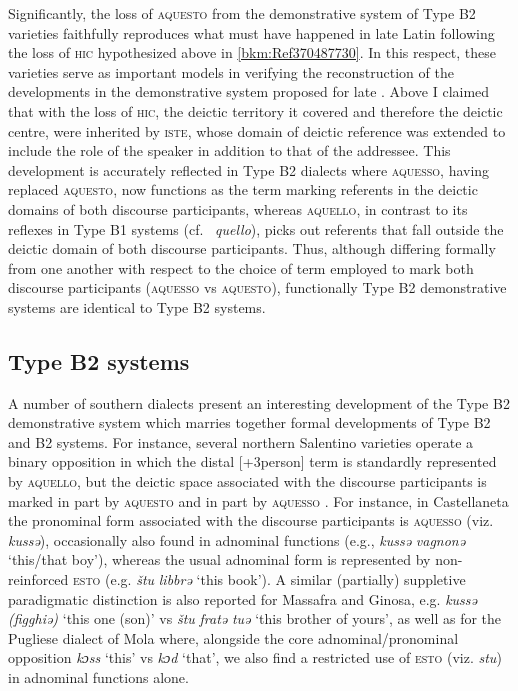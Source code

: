 \documentclass[output=paper]{langsci/langscibook}
\begin{document}
Significantly, the loss of \textsc{aquesto} from the demonstrative system of
Type B2 varieties faithfully reproduces what must have happened in late
Latin following the loss of \textsc{hic} hypothesized above in
\cref{bkm:Ref370487730}. In this respect, these varieties serve as important
models in verifying the reconstruction of the developments in the demonstrative
system proposed for late . Above I claimed that with the loss of
\textsc{hic}, the deictic territory it covered and therefore the deictic
centre, were inherited by \textsc{iste}, whose domain of deictic reference was
extended to include the role of the speaker in addition to that of the
addressee. This development is accurately reflected in Type B2 dialects
where \textsc{aquesso}, having replaced \textsc{aquesto}, now functions as the
term marking referents in the deictic domains of both discourse participants,
whereas \textsc{aquello}, in contrast to its reflexes in Type B1 systems
(cf.\  \emph{quello}), picks out referents that fall outside the deictic
domain of both discourse participants. Thus, although differing formally from
one another with respect to the choice of term employed to mark both discourse
participants (\textsc{aquesso} vs \textsc{aquesto}), functionally Type
B2 demonstrative systems are identical to Type B2 systems.

\subsection{Type B2 systems}

A number of southern  dialects present an interesting development
of the Type B2 demonstrative system which marries together
formal developments of Type B2 and B2 systems. For instance,
several northern Salentino varieties operate a binary opposition in which the
distal [+3person] term is standardly represented by \textsc{aquello}, but the
deictic space associated with the discourse participants is marked in part by
\textsc{aquesto} and in part by \textsc{aquesso} \citep[157]{Mancarella:1998a}.
For instance, in Castellaneta the pronominal form associated with the discourse
participants is \textsc{aquesso} (viz. \emph{kussə}), occasionally also found
in adnominal functions (e.g., \emph{kussə} \emph{vagnonə} ‘this/that boy’),
whereas the usual adnominal form is represented by non-reinforced \textsc{esto}
(e.g. \emph{štu} \emph{libbrə} ‘this book’). A similar (partially) suppletive
paradigmatic distinction is also reported for Massafra and Ginosa, e.g.
\emph{kussə} \emph{(figghiə)} ‘this one (son)’ vs \emph{štu} \emph{fratə}
\emph{tuə} ‘this brother of yours’, as well as for the Pugliese dialect of Mola
\citep[62f]{Cox-Mildare:2001a} where, alongside the core adnominal/pronominal
opposition \emph{kɔss} ‘this’ vs \emph{kɔd} ‘that’, we also find a restricted
use of \textsc{esto} (viz. \emph{stu}) in adnominal functions alone.
\end{document}
